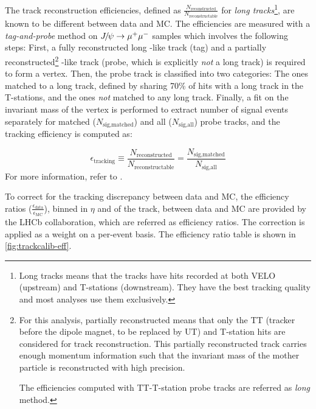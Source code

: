 The track reconstruction efficiencies,
defined as $\frac{N_\text{reconstructed}}{N_\text{reconstructable}}$ for
\emph{long tracks}\footnote{
    Long tracks means that the tracks have hits recorded at both VELO (upstream)
    and T-stations (downstream).
    They have the best tracking quality and most analyses use them exclusively.
},
are known to be different between data and MC.
The efficiencies are measured with a \emph{tag-and-probe} method on
${{J\mskip -3mu/\mskip -2mu\psi}} \rightarrow {\ensuremath{\mu^+}}{\ensuremath{\mu^-}}$ samples
which involves the following steps:
First, a fully reconstructed long \muon-like track (tag) and a partially
reconstructed\footnote{
    For this analysis, partially reconstructed means that only the
    TT (tracker before the dipole magnet, to be replaced by UT)
    and T-station hits are considered for track reconstruction.
    This partially reconstructed track carries enough momentum information
    such that the invariant mass of the mother particle is reconstructed
    with high precision.

    The efficiencies computed with TT-T-station probe tracks are referred
    as \emph{long} method.
} \muon-like track (probe, which is explicitly \emph{not} a long track) is
required to form a \mun\mup vertex.
Then, the probe track is classified into two categories: The ones matched to a
long track, defined by sharing 70\% of hits with a long track in the T-stations,
and the ones \emph{not} matched to any long track.
Finally, a fit on the invariant mass of the \mun\mup vertex is performed to
extract number of signal events
separately for matched ($N_\text{sig,matched}$)
and all ($N_\text{sig,all}$) probe tracks,
and the tracking efficiency is computed as:

\begin{equation}
    \epsilon_\text{tracking} \equiv
        \frac{N_\text{reconstructed}}{N_\text{reconstructable}}
        = \frac{N_\text{sig,matched}}{N_\text{sig,all}}
\end{equation}
For more information, refer to \cite{LHCb-PUB-2011-025,LHCb-DP-2013-002}.

To correct for the tracking discrepancy between data and MC,
the efficiency ratios
($\frac{\epsilon_\text{data}}{\epsilon_\text{MC}}$),
binned in $\eta$ and \ptot of the track,
between data and MC are provided by the LHCb collaboration, which are
referred as \trackcalib efficiency ratios.
The correction is applied as a weight on a per-event basis.
The efficiency ratio table is shown in \cref{fig:trackcalib-eff}.


